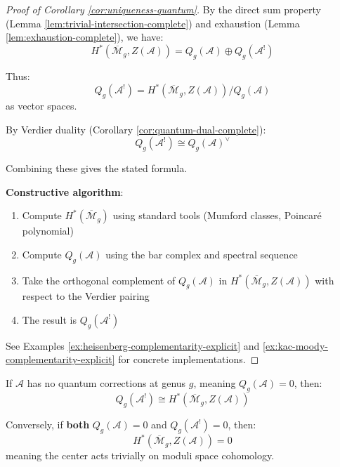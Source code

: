 \begin{proof}[Proof of Corollary \ref{cor:uniqueness-quantum}]
By the direct sum property (Lemma \ref{lem:trivial-intersection-complete}) and exhaustion 
(Lemma \ref{lem:exhaustion-complete}), we have:
\begin{equation}
H^*(\overline{\mathcal{M}}_g, Z(\mathcal{A})) = Q_g(\mathcal{A}) \oplus Q_g(\mathcal{A}^!)
\end{equation}

Thus:
\begin{equation}
Q_g(\mathcal{A}^!) = H^*(\overline{\mathcal{M}}_g, Z(\mathcal{A})) / Q_g(\mathcal{A})
\end{equation}
as vector spaces.

By Verdier duality (Corollary \ref{cor:quantum-dual-complete}):
\begin{equation}
Q_g(\mathcal{A}^!) \cong Q_g(\mathcal{A})^\vee
\end{equation}

Combining these gives the stated formula.

\textbf{Constructive algorithm}:
\begin{enumerate}
\item Compute $H^*(\overline{\mathcal{M}}_g)$ using standard tools (Mumford classes, 
Poincaré polynomial)
\item Compute $Q_g(\mathcal{A})$ using the bar complex and spectral sequence
\item Take the orthogonal complement of $Q_g(\mathcal{A})$ in $H^*(\overline{
\mathcal{M}}_g, Z(\mathcal{A}))$ with respect to the Verdier pairing
\item The result is $Q_g(\mathcal{A}^!)$
\end{enumerate}

See Examples \ref{ex:heisenberg-complementarity-explicit} and \ref{ex:kac-moody-
complementarity-explicit} for concrete implementations.
\end{proof}

\begin{corollary}
\label{cor:vanishing-quantum}
If $\mathcal{A}$ has no quantum corrections at genus $g$, meaning $Q_g(\mathcal{A}) = 0$, 
then:
\begin{equation}
Q_g(\mathcal{A}^!) \cong H^*(\overline{\mathcal{M}}_g, Z(\mathcal{A}))
\end{equation}

Conversely, if \textbf{both} $Q_g(\mathcal{A}) = 0$ and $Q_g(\mathcal{A}^!) = 0$, then:
\begin{equation}
H^*(\overline{\mathcal{M}}_g, Z(\mathcal{A})) = 0
\end{equation}
meaning the center acts trivially on moduli space cohomology.
\end{corollary}

